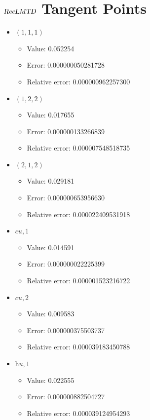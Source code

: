 \documentclass{article}%
\begin{document}
\section{$\textsl{RecLMTD}$ Tangent Points}%
\thispagestyle{plain}%
\begin{itemize}%
	\item $(1, 1, 1)$%
	\begin{itemize}%
		\item Value: 0.052254%
		\item Error: 0.000000050281728%
		\item Relative error: 0.000000962257300%
	\end{itemize}%
	\item $(1, 2, 2)$%
	\begin{itemize}%
		\item Value: 0.017655%
		\item Error: 0.000000133266839%
		\item Relative error: 0.000007548518735%
	\end{itemize}%
	\item $(2, 1, 2)$%
	\begin{itemize}%
		\item Value: 0.029181%
		\item Error: 0.000000653956630%
		\item Relative error: 0.000022409531918%
	\end{itemize}%
	\item $\textit{cu},1$%
	\begin{itemize}%
		\item Value: 0.014591%
		\item Error: 0.000000022225399%
		\item Relative error: 0.000001523216722%
	\end{itemize}%
	\item $\textit{cu},2$%
	\begin{itemize}%
		\item Value: 0.009583%
		\item Error: 0.000000375503737%
		\item Relative error: 0.000039183450788%
	\end{itemize}%
	\item $\textit{hu},1$%
	\begin{itemize}%
		\item Value: 0.022555%
		\item Error: 0.000000882504727%
		\item Relative error: 0.000039124954293%
	\end{itemize}%
\end{itemize}%
\end{document}
